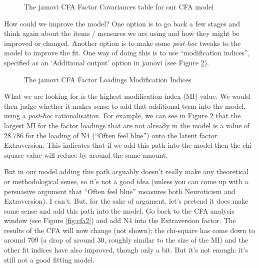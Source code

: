 \begin{figure}[!htb]
\begin{center}
\caption{The jamovi CFA Factor Covariances table for our CFA model}
\label{fig:cfa5}
\HR
\end{center}
\end{figure}

How could we improve the model? One option is to go back a few stages and think again about the items / measures we are using and how they might be improved or changed. Another option is to make some {\it post-hoc} tweaks to the model to improve the fit. One way of doing this is to use “modification indices”, specified as an ‘Additional output’ option in jamovi (see Figure \ref{fig:cfa6}).

\begin{figure}[!htb]
\begin{center}
\caption{The jamovi CFA Factor Loadings Modification Indices}
\label{fig:cfa6}
\HR
\end{center}
\end{figure}

What we are looking for is the highest modification index (MI) value. We would then judge whether it makes sense to add that additional term into the model, using a {\it post-hoc} rationalisation. For example, we can see in Figure \ref{fig:cfa6} that the largest MI for the factor loadings that are not already in the model is a value of 28.786 for the loading of N4 (“Often feel blue”) onto the latent factor Extraversion. This indicates that if we add this path into the model then the chi-square value will reduce by around the same amount. 

But in our model adding this path arguably doesn't really make any theoretical or methodological sense, so it’s not a good idea (unless you can come up with a persuasive argument that “Often feel blue” measures both Neuroticism and Extraversion). I can’t. But, for the sake of argument, let’s pretend it does make some sense and add this path into the model. Go back to the CFA analysis window (see Figure \ref{fig:cfa2}) and add N4 into the Extraversion factor. The results of the CFA will now change (not shown); the chi-square has come down to around 709 (a drop of around 30, roughly similar to the size of the MI) and the other fit indices have also improved, though only a bit. But it's not enough: it’s still not a good fitting model.

